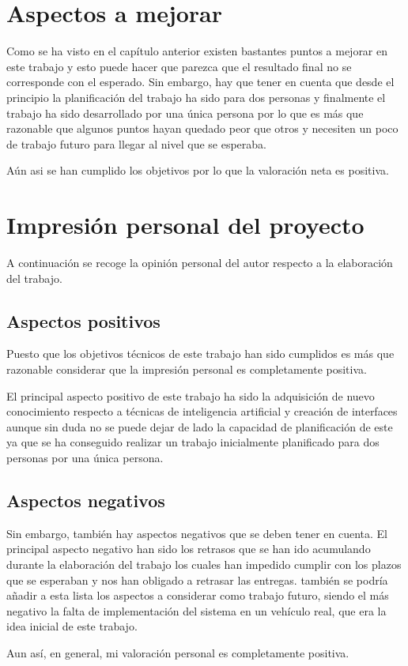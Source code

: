 \section{Aspectos a mejorar}
Como se ha visto en el capítulo anterior existen bastantes puntos a mejorar en este trabajo y esto puede hacer que parezca que el resultado final no se corresponde con el esperado. Sin embargo, hay que tener en cuenta que desde el principio la planificación del trabajo ha sido para dos personas y finalmente el trabajo ha sido desarrollado por una única persona por lo que es más que razonable que algunos puntos hayan quedado peor que otros y necesiten un poco de trabajo futuro para llegar al nivel que se esperaba.

Aún asi se han cumplido los objetivos por lo que la valoración neta es positiva.

\section{Impresión personal del proyecto}
A continuación se recoge la opinión personal del autor respecto a la elaboración del trabajo.

\subsection{Aspectos positivos}
Puesto que los objetivos técnicos de este trabajo han sido cumplidos es más que razonable considerar que la impresión personal es completamente positiva. 

El principal aspecto positivo de este trabajo ha sido la adquisición de nuevo conocimiento respecto a técnicas de inteligencia artificial y creación de interfaces aunque sin duda no se puede dejar de lado la capacidad de planificación de este ya que se ha conseguido realizar un trabajo inicialmente planificado para dos personas por una única persona.

\subsection{Aspectos negativos}
Sin embargo, también hay aspectos negativos que se deben tener en cuenta. El principal aspecto negativo han sido los retrasos que se han ido acumulando durante la elaboración del trabajo los cuales han impedido cumplir con los plazos que se esperaban y nos han obligado a retrasar las entregas.
también se podría añadir a esta lista los aspectos a considerar como trabajo futuro, siendo el más negativo la falta de implementación del sistema en un vehículo real, que era la idea inicial de este trabajo. 

Aun así, en general, mi valoración personal es completamente positiva.
